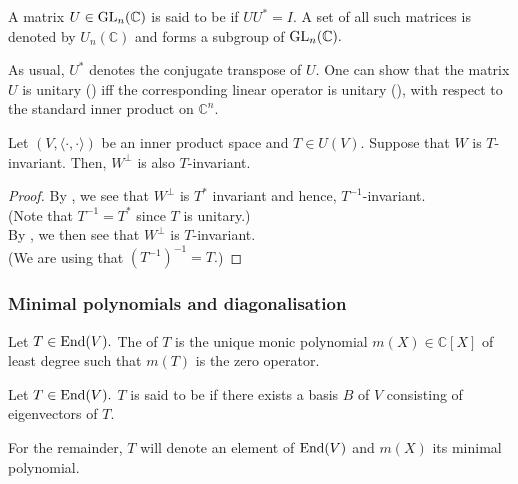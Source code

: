 \begin{defn}%
	\label{defn:unitarymatrix}
	A matrix $U \in \operatorname{GL}_n(\mathbb{C})$ is said to be  if $UU^* = I.$ A set of all such matrices is denoted by $U_n(\mathbb{C})$ and forms a subgroup of $\operatorname{GL}_n(\mathbb{C}).$
\end{defn}
As usual, $U^*$ denotes the conjugate transpose of $U.$ One can show that the matrix $U$ is unitary () iff the corresponding linear operator is unitary (), with respect to the standard inner product on $\mathbb{C}^n.$

\begin{cor} \label{cor:unitaryinvariance}
	Let $(V, \langle \cdot, \cdot\rangle)$ be an inner product space and $T \in U(V).$ Suppose that $W$ is $T$-invariant. Then, $W^\perp$ is also $T$-invariant.
\end{cor}
\begin{proof} 
	By , we see that $W^\perp$ is $T^*$ invariant and hence, $T^{-1}$-invariant.\\
	(Note that $T^{-1} = T^*$ since $T$ is unitary.)\\
	By , we then see that $W^\perp$ is $T$-invariant. \\
	(We are using that $(T^{-1})^{-1} = T.$)
\end{proof}

\subsubsection{Minimal polynomials and diagonalisation} 

\begin{defn}%
	Let $T \in \operatorname{End}(V).$ The  of $T$ is the unique monic polynomial $m(X) \in \mathbb{C}[X]$ of least degree such that $m(T)$ is the zero operator.
\end{defn} 

\begin{defn}%
	Let $T \in \operatorname{End}(V).$ $T$ is said to be  if there exists a basis $B$ of $V$ consisting of eigenvectors of $T.$
\end{defn}

For the remainder, $T$ will denote an element of $\operatorname{End}(V)$ and $m(X)$ its minimal polynomial.

